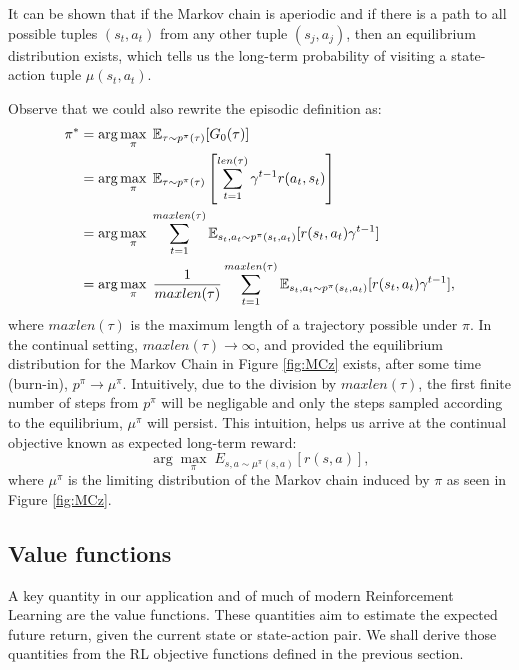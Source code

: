 \documentclass{report}
\numberwithin{equation}{section}
\numberwithin{figure}{section}
\numberwithin{table}{section}
\numberwithin{algorithm}{section}
\begin{document}
It can be shown that if the Markov chain is aperiodic and if there 
is a path to all possible tuples $(s_t, a_t)$ from any other tuple 
$(s_j, a_j)$, then an equilibrium distribution exists, which 
tells us the long-term probability of visiting a state-action tuple 
$\mu(s_t, a_t)$.

Observe that we could also rewrite the episodic definition as:
\begin{align}
  \label{eq:cont_objective}
  \pi^*&=\arg \max_{\pi}\; \mathbb{E}_{\tau\sim p^{\pi}(\tau)}[G_0(\tau)]\notag\\
  &=\arg \max_{\pi}\; \mathbb{E}_{\tau\sim p^{\pi}(\tau)}\left[\sum_{t=1}^{len(\tau)}\gamma^{t-1}r(a_{t}, s_{t})\right]\\
  &=\arg \max_{\pi}\; \sum_{t=1}^{maxlen(\tau)}\mathbb{E}_{s_{t}, a_{t}\sim p^{\pi}(s_{t}, a_{t})}[r(s_t, a_t)\gamma^{t-1}]\\
  &=\arg \max_{\pi}\; \frac{1}{maxlen(\tau)}\sum_{t=1}^{maxlen(\tau)}\mathbb{E}_{s_{t}, a_{t}\sim p^{\pi}(s_{t}, a_{t})}[r(s_{t}, a_{t})\gamma^{t-1}],
\end{align}
where $maxlen(\tau)$ is the maximum length of a trajectory possible under $\pi$. 
In the continual setting, $maxlen(\tau)\rightarrow\infty$, and provided the 
equilibrium distribution for the Markov Chain in Figure 
\ref{fig:MCz} exists, 
after some time (burn-in), $p^{\pi}\rightarrow \mu^{\pi}$. Intuitively,
 due to the division by $maxlen(\tau)$, 
the first finite number of steps from $p^{\pi}$ 
will be negligable and only the steps sampled according to the equilibrium, 
$\mu^{\pi}$ will persist. This intuition, helps us arrive at the 
continual objective known as expected long-term reward:
\begin{equation}\label{eq:continualObjective}
  \arg \max_{\pi}\; {E}_{s, a\sim \mu^{\pi}(s, a)}[r(s, a)],
\end{equation}
where $\mu^{\pi}$ is the limiting distribution of the Markov chain 
induced by $\pi$ as seen in Figure \ref{fig:MCz}.



\subsection{Value functions}\label{sec:valueFuncs}
A key quantity in our application and of much of modern Reinforcement Learning 
are the value functions. These quantities aim to estimate the 
expected future return, given the current state or state-action pair. 
We shall derive those quantities from the RL objective functions 
defined in the previous section.
\end{document}
